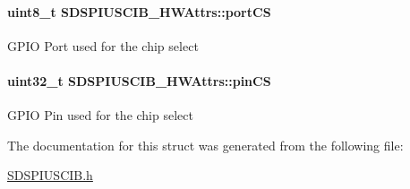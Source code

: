 \paragraph[{port\+C\+S}]{\setlength{\rightskip}{0pt plus 5cm}uint8\+\_\+t S\+D\+S\+P\+I\+U\+S\+C\+I\+B\+\_\+\+H\+W\+Attrs\+::port\+C\+S}\label{struct_s_d_s_p_i_u_s_c_i_b___h_w_attrs_a0129b7fe4659c981ba8f10972587f845}
G\+P\+I\+O Port used for the chip select 
\paragraph[{pin\+C\+S}]{\setlength{\rightskip}{0pt plus 5cm}uint32\+\_\+t S\+D\+S\+P\+I\+U\+S\+C\+I\+B\+\_\+\+H\+W\+Attrs\+::pin\+C\+S}\label{struct_s_d_s_p_i_u_s_c_i_b___h_w_attrs_a3afe9dbe3f17c8dbb9994eb936e57db1}
G\+P\+I\+O Pin used for the chip select 

The documentation for this struct was generated from the following file\+:\begin{DoxyCompactItemize}
\item 
\hyperlink{_s_d_s_p_i_u_s_c_i_b_8h}{S\+D\+S\+P\+I\+U\+S\+C\+I\+B.\+h}\end{DoxyCompactItemize}
